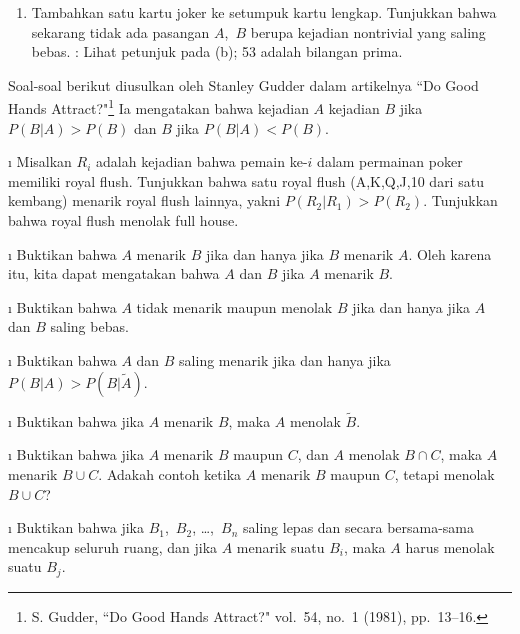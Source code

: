 \begin{LJSItem}
\begin{enumerate}
\item Tambahkan satu kartu joker ke setumpuk kartu lengkap.  Tunjukkan bahwa sekarang tidak ada pasangan $A$,~$B$
berupa kejadian nontrivial yang saling bebas.  : Lihat petunjuk pada
(b); 53 adalah bilangan prima.
\end{enumerate}
\par
\medskip
\noindent
Soal-soal berikut diusulkan oleh Stanley Gudder dalam artikelnya
``Do Good Hands Attract?"\footnote{S. Gudder, ``Do Good Hands Attract?"  vol.~54, no.~1 (1981), pp.~13--16.}  Ia mengatakan bahwa
kejadian $A$  kejadian $B$ jika $P(B|A) > P(B)$ dan 
$B$ jika $P(B|A) < P(B)$.

\i\label{exer 4.1.39} Misalkan $R_i$ adalah kejadian bahwa pemain ke-$i$ dalam permainan poker memiliki
royal flush.  Tunjukkan bahwa satu royal flush (A,K,Q,J,10 dari satu kembang) menarik royal flush lainnya, 
yakni $P(R_2|R_1) > P(R_2)$.  Tunjukkan bahwa royal flush menolak full house.

\i\label{exer 4.1.40} Buktikan bahwa $A$ menarik $B$ jika dan hanya jika $B$ menarik $A$.  Oleh karena itu, kita
dapat mengatakan bahwa $A$ dan $B$  jika $A$ menarik $B$.

\i\label{exer 4.1.41} Buktikan bahwa $A$ tidak menarik maupun menolak $B$ jika dan hanya jika $A$ dan
$B$ saling bebas.

\i\label{exer 4.1.42} Buktikan bahwa $A$ dan $B$ saling menarik jika dan hanya jika $P(B|A) >
P(B|\tilde A)$.

\i\label{exer 4.1.43} Buktikan bahwa jika $A$ menarik $B$, maka $A$ menolak $\tilde B$.

\i\label{exer 4.1.44} Buktikan bahwa jika $A$ menarik $B$ maupun $C$, dan $A$ menolak $B \cap C$,
maka $A$ menarik $B \cup C$.  Adakah contoh ketika $A$ menarik
$B$ maupun $C$, tetapi menolak $B \cup C$?

\i\label{exer 4.1.45} Buktikan bahwa jika $B_1$,~$B_2$, \dots,~$B_n$ saling lepas dan
secara bersama-sama mencakup seluruh ruang, dan jika $A$ menarik suatu $B_i$, maka $A$ harus menolak
suatu $B_j$.


\end{LJSItem}
